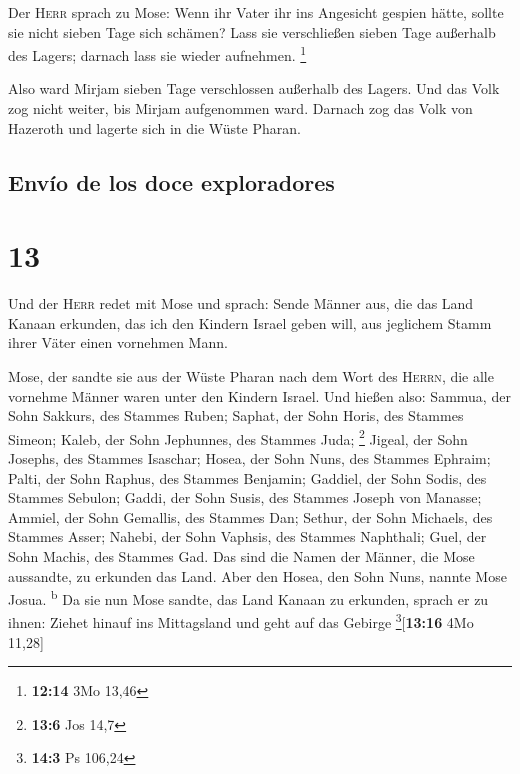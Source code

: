 Der \textsc{Herr} sprach zu Mose: Wenn ihr Vater ihr ins
Angesicht gespien hätte, sollte sie nicht sieben Tage sich schämen? Lass
sie verschließen sieben Tage außerhalb des Lagers; darnach lass sie
wieder aufnehmen. \footnote{\textbf{12:14} 3Mo 13,46}

 Also ward Mirjam sieben Tage verschlossen außerhalb des
Lagers. Und das Volk zog nicht weiter, bis Mirjam aufgenommen ward.
 Darnach zog das Volk von Hazeroth und lagerte sich in
die Wüste Pharan.

\hypertarget{envuxedo-de-los-doce-exploradores}{%
\subsection{Envío de los doce
exploradores}\label{envuxedo-de-los-doce-exploradores}}

\hypertarget{section-12}{%
\section{13}\label{section-12}}

 Und der \textsc{Herr} redet mit Mose und sprach:
 Sende Männer aus, die das Land Kanaan erkunden, das ich
den Kindern Israel geben will, aus jeglichem Stamm ihrer Väter einen
vornehmen Mann.

 Mose, der sandte sie aus der Wüste Pharan nach dem Wort
des \textsc{Herrn}, die alle vornehme Männer waren unter den Kindern
Israel.  Und hießen also: Sammua, der Sohn Sakkurs, des
Stammes Ruben;  Saphat, der Sohn Horis, des Stammes
Simeon;  Kaleb, der Sohn Jephunnes, des Stammes Juda;
\footnote{\textbf{13:6} Jos 14,7}  Jigeal, der Sohn
Josephs, des Stammes Isaschar;  Hosea, der Sohn Nuns, des
Stammes Ephraim;  Palti, der Sohn Raphus, des Stammes
Benjamin;  Gaddiel, der Sohn Sodis, des Stammes Sebulon;
 Gaddi, der Sohn Susis, des Stammes Joseph von Manasse;
 Ammiel, der Sohn Gemallis, des Stammes Dan;
 Sethur, der Sohn Michaels, des Stammes Asser;
 Nahebi, der Sohn Vaphsis, des Stammes Naphthali;
 Guel, der Sohn Machis, des Stammes Gad. 
Das sind die Namen der Männer, die Mose aussandte, zu erkunden das Land.
Aber den Hosea, den Sohn Nuns, nannte Mose Josua. \textsuperscript{b}
 Da sie nun Mose sandte, das Land Kanaan zu erkunden,
sprach er zu ihnen: Ziehet hinauf ins Mittagsland und geht auf das
Gebirge \footnote{\textbf{14:3} Ps 106,24}{[}\textbf{13:16} 4Mo 11,28{]}

